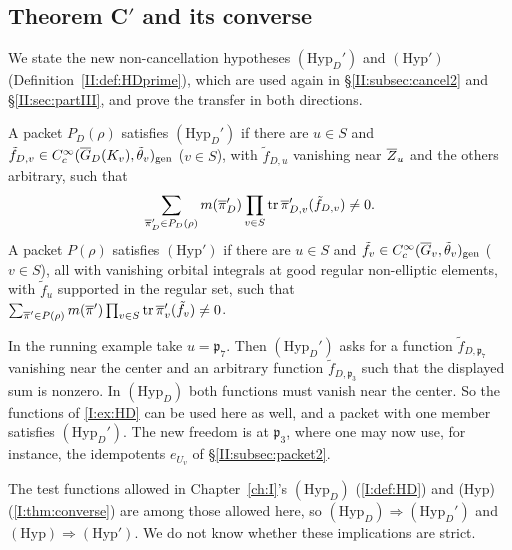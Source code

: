 \subsection{Theorem C$'$ and its converse}\label{II:subsec:Cprime}
We state the new non-cancellation hypotheses $(\mathrm{Hyp}_D')$ and $(\mathrm{Hyp}')$ (Definition~\ref{II:def:HDprime}), which are used again in \S\ref{II:subsec:cancel2} and \S\ref{II:sec:partIII}, and prove the transfer in both directions.

\begin{definition}\label{II:def:HDprime}
A packet $P_D(\rho)$ satisfies $(\mathrm{Hyp}_D')$ if there are $u\in S$ and $\tilde f_{D,v}\in C_c^\infty(\overline{G}_D(K_v),\tilde\theta_v)_{\mathrm{gen}}$ ($v\in S$), with $\tilde f_{D,u}$ vanishing near $\overline{Z}_u$ and the others arbitrary, such that
\[ \sum_{\overline{\pi}'_D\in P_D(\rho)}m(\overline{\pi}'_D)\prod_{v\in S}\operatorname{tr}\overline{\pi}'_{D,v}(\tilde f_{D,v})\neq0 . \]
A packet $P(\rho)$ satisfies $(\mathrm{Hyp}')$ if there are $u\in S$ and $\tilde f_v\in C_c^\infty(\overline{G}_v,\tilde\theta_v)_{\mathrm{gen}}$ ($v\in S$), all with vanishing orbital integrals at good regular non-elliptic elements, with $\tilde f_u$ supported in the regular set, such that $\sum_{\overline{\pi}'\in P(\rho)}m(\overline{\pi}')\prod_{v\in S}\operatorname{tr}\overline{\pi}'_v(\tilde f_v)\ne0$.
\end{definition}

\begin{example}\label{II:ex:HDprime}
In the running example take $u=\mathfrak p_7$. Then $(\mathrm{Hyp}_D')$ asks for a function $\tilde f_{D,\mathfrak p_7}$ vanishing near the center and an arbitrary function $\tilde f_{D,\mathfrak p_3}$ such that the displayed sum is nonzero. In $(\mathrm{Hyp}_D)$ both functions must vanish near the center. So the functions of \cref{I:ex:HD} can be used here as well, and a packet with one member satisfies $(\mathrm{Hyp}_D')$. The new freedom is at $\mathfrak p_3$, where one may now use, for instance, the idempotents $e_{U_v}$ of \S\ref{II:subsec:packet2}.
\end{example}


The test functions allowed in Chapter~\ref{ch:I}'s $(\mathrm{Hyp}_D)$ (\cref{I:def:HD}) and (Hyp) (\cref{I:thm:converse}) are among those allowed here, so $(\mathrm{Hyp}_D)\Rightarrow(\mathrm{Hyp}_D')$ and $(\mathrm{Hyp})\Rightarrow(\mathrm{Hyp}')$. We do not know whether these implications are strict.


